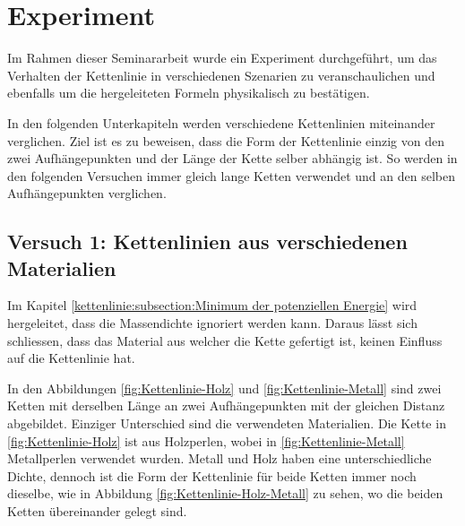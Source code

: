 %
%
%
%
\section{Experiment\label{kettenlinie:section:Experiment}}
Im Rahmen dieser Seminararbeit wurde ein Experiment durchgeführt, um das Verhalten der Kettenlinie in verschiedenen Szenarien zu veranschaulichen und ebenfalls um die hergeleiteten Formeln physikalisch zu bestätigen.

In den folgenden Unterkapiteln werden verschiedene Kettenlinien miteinander verglichen.
Ziel ist es zu beweisen, dass die Form der Kettenlinie einzig von den zwei Aufhängepunkten und der Länge der Kette selber abhängig ist.
So werden in den folgenden Versuchen immer gleich lange Ketten verwendet und an den selben Aufhängepunkten verglichen.

\subsection{Versuch 1: Kettenlinien aus verschiedenen Materialien
\label{kettenlinie:subsection:massendichte}}
Im Kapitel \ref{kettenlinie:subsection:Minimum der potenziellen Energie} wird hergeleitet, dass die Massendichte ignoriert werden kann. Daraus lässt sich schliessen, dass das Material aus welcher die Kette gefertigt ist, keinen Einfluss auf die Kettenlinie hat.

In den Abbildungen \ref{fig:Kettenlinie-Holz} und \ref{fig:Kettenlinie-Metall} sind zwei Ketten mit derselben Länge an zwei Aufhängepunkten mit der gleichen Distanz abgebildet.
Einziger Unterschied sind die verwendeten Materialien.
Die Kette in \ref{fig:Kettenlinie-Holz} ist aus Holzperlen, wobei in \ref{fig:Kettenlinie-Metall} Metallperlen verwendet wurden.
Metall und Holz haben eine unterschiedliche Dichte, dennoch ist die Form der Kettenlinie für beide Ketten immer noch dieselbe, wie in Abbildung \ref{fig:Kettenlinie-Holz-Metall} zu sehen, wo die beiden Ketten übereinander gelegt sind.

